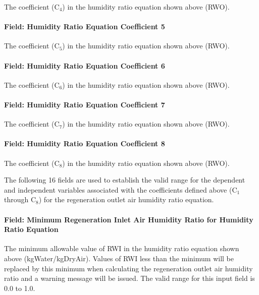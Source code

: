 The coefficient (C\(_{4}\)) in the humidity ratio equation shown above (RWO).

\paragraph{Field: Humidity Ratio Equation Coefficient 5}\label{field-humidity-ratio-equation-coefficient-5}

The coefficient (C\(_{5}\)) in the humidity ratio equation shown above (RWO).

\paragraph{Field: Humidity Ratio Equation Coefficient 6}\label{field-humidity-ratio-equation-coefficient-6}

The coefficient (C\(_{6}\)) in the humidity ratio equation shown above (RWO).

\paragraph{Field: Humidity Ratio Equation Coefficient 7}\label{field-humidity-ratio-equation-coefficient-7}

The coefficient (C\(_{7}\)) in the humidity ratio equation shown above (RWO).

\paragraph{Field: Humidity Ratio Equation Coefficient 8}\label{field-humidity-ratio-equation-coefficient-8}

The coefficient (C\(_{8}\)) in the humidity ratio equation shown above (RWO).

The following 16 fields are used to establish the valid range for the dependent and independent variables associated with the coefficients defined above (C\(_{1}\) through C\(_{8}\)) for the regeneration outlet air humidity ratio equation.

\paragraph{Field: Minimum Regeneration Inlet Air Humidity Ratio for Humidity Ratio Equation}\label{field-minimum-regeneration-inlet-air-humidity-ratio-for-humidity-ratio-equation}

The minimum allowable value of RWI in the humidity ratio equation shown above (kgWater/kgDryAir). Values of RWI less than the minimum will be replaced by this minimum when calculating the regeneration outlet air humidity ratio and a warning message will be issued. The valid range for this input field is 0.0 to 1.0.

